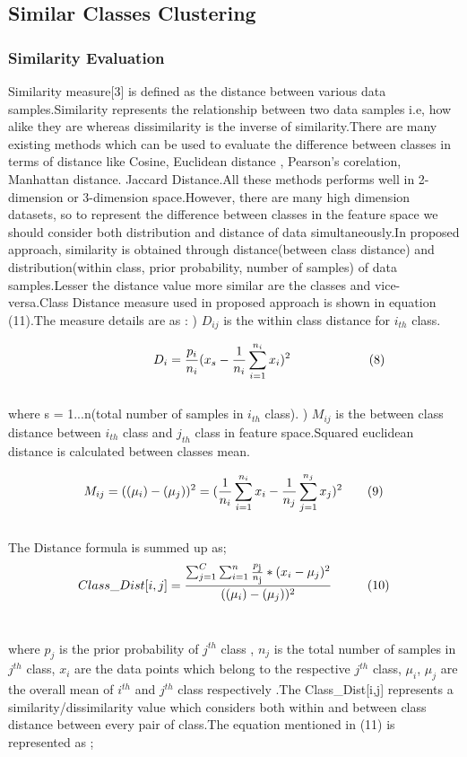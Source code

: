 \documentclass[a4paper, 10pt, conference]{ieeeconf}      %
\begin{document}
\subsection{Similar Classes Clustering}

\subsubsection{Similarity Evaluation}
Similarity measure[3] is defined as the distance between various data samples.Similarity represents the relationship between two data samples i.e, how alike they are whereas dissimilarity is the inverse of similarity.There are many existing methods which can be used to evaluate the difference between classes in terms of distance like Cosine, Euclidean distance , Pearson's corelation, Manhattan distance. Jaccard Distance.All these methods performs well in 2-dimension or 3-dimension space.However, there are many high dimension datasets, so to represent the difference between classes in the feature space we should consider both distribution and distance of data simultaneously.In proposed approach, similarity is obtained through  distance(between class distance) and distribution(within class, prior probability, number of samples) of data samples.Lesser the distance value more similar are the classes and vice-versa.Class Distance measure used in proposed approach is shown in equation (11).The measure details are as : 
) $D_{ij}$ is the within class distance for $i_{th}$ class.

\[\hspace{2cm}D_{i} = \frac{p_{i}}{n_{i}}(x_{s}-\frac{1}{n_{i}}\sum_{i=1}^{n_{i}}x_{i})^{2}\hspace{2.2cm}(8)\]\\  
where s = 1...n(total number of samples in $i_{th}$ class).
) $M_{ij}$ is the between class distance between $i_{th}$ class and $j_{th}$ class in feature space.Squared euclidean distance is calculated between classes mean.
\par
\[M_{ij} = ((\mu_{i})-(\mu_{j}))^{2} = (\frac{1}{n_{i}}\sum_{i=1}^{n_{i}}x_{i} - \frac{1}{n_{j}}\sum_{j=1}^{n_{j}}x_{j})^{2}\hspace{0.7cm}(9)\] \\
The Distance formula is summed up as;
\[Class\_Dist[i,j] = \frac{\sum_{j=1}^{C}\sum_{i=1}^{n}\frac{p\textsubscript{j}}{n\textsubscript{j}}*(x_{i}-\mu_{j})\textsuperscript{2}}{((\mu_{i})-(\mu_{j}))^{2}}\hspace{1cm}(10) \] \\  
\par 
where $p_{j}$ is the prior probability of $j^{th}$ class , $n_{j}$ is the total number of samples in $j^{th}$ class, $x_{i}$ are the data points which belong to the respective $j^{th}$ class, $\mu_{i}$,  $\mu_{j}$ are the overall mean of $i^{th}$ and $j^{th}$ class respectively .The Class\_Dist[i,j] represents a similarity/dissimilarity value which considers both within and between class distance between every pair of class.The equation mentioned in (11) is represented as ;
\end{document}
